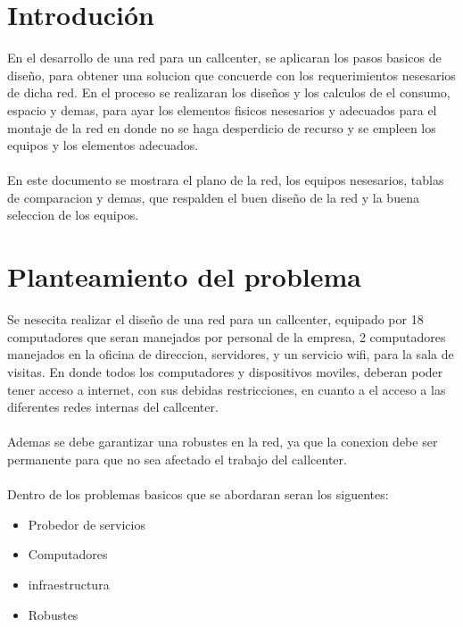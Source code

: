 \documentclass[12pt]{article}
\begin{document}
\maketitle
\pagebreak

\tableofcontents

\pagebreak 
\section{\textbf{Introduci\'on}}
En el desarrollo de una red para un callcenter, se aplicaran los pasos basicos de diseño, para obtener una solucion que concuerde con los requerimientos nesesarios de dicha red. En el proceso se realizaran los diseños y los calculos de el consumo, espacio y demas, para ayar los elementos fisicos nesesarios y adecuados para el montaje de la red en donde no se haga desperdicio de recurso y se empleen los equipos y los elementos adecuados.\\\\

En este documento se mostrara el plano de la red, los equipos nesesarios, tablas de comparacion y demas, que respalden el buen diseño de la red y la buena seleccion de los equipos.

\pagebreak
\section{\textbf{Planteamiento del problema}}
Se nesecita realizar el diseño de una red para un callcenter, equipado por 18 computadores que seran manejados por personal de la empresa, 2 computadores manejados en la oficina de direccion, servidores, y un servicio wifi, para la sala de visitas. En donde todos los computadores y dispositivos moviles, deberan poder tener acceso a internet, con sus debidas restricciones, en cuanto a el acceso a las diferentes redes internas del callcenter.\\\\
Ademas se debe garantizar una robustes en la red, ya que la conexion debe ser permanente para que no sea afectado el trabajo del callcenter.\\\\
Dentro de los problemas basicos que se abordaran seran los siguentes:
\begin{itemize}
\item
Probedor de servicios
\item
Computadores
\item
infraestructura
\item
Robustes
\end{itemize}
\end{document}
